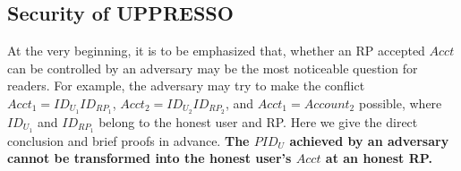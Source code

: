 \begin{comment}
 Below is a brief description about the processes and scripts in UPPRESSO.
\vspace{-\topsep}
\begin{itemize}
\item A browser is an atomic process, which is responsible for sending HTTP requests, receiving HTTP responses, handling user actions, and transmitting messages between scripting processes. As the browsers are considered honest, in the remaining analysis, we focus only on the scripting processes running in the browsers. We refer interested readers to Appendix C and \cite{SPRESSO} for more details about the browser process.
\item The IdP server process (defined as $p^i$) only accepts the events whose message is an HTTP request with a path in the set of {\sf \{/script, /dynamicRegistration, /login, /loginInfo, /authorize\}}. %
All the events can be accepted by $p^i$ in any state, but the output may vary. %
\item The RP server process (denoted as $p^r$) only accepts the events whose message is an HTTP request with a path in {\sf \{/script, /login, /startNegotiation, /registrationResult, /uploadToken\}}. %
However, an event with a path in {\sf \{ /script, /login, /startNegotiation\}} can be accepted in any state, while an event with a path $\equiv$ {\sf /registrationResult} is accepted only when the state $s$ is the output of an event whose path $\equiv$ {\sf /startNegotiation}. Similarly, the following accepted events should have a path in {\sf \{/registrationResult, /uploadToken\}}.
\item The IdP and RP scripting processes accept the events in the form of HTTP response and postMessage. %
\end{itemize}
\end{comment}

\subsection{Security of UPPRESSO}
At the very beginning, it is to be emphasized that, whether an RP accepted $Acct$ can be controlled by an adversary may be the most noticeable question for readers.
For example, the adversary may try to make the conflict $Acct_1=ID_{U_1}ID_{RP_1}$, $Acct_2=ID_{U_2}ID_{RP_2}$, and $Acct_1=Account_2$ possible, where $ID_{U_1}$ and $ID_{RP_1}$ belong to the honest user and RP.
Here we give the direct conclusion and brief proofs in advance. \textbf{The $PID_U$ achieved by an adversary cannot be transformed into the honest user's $Acct$ at an honest RP.}

